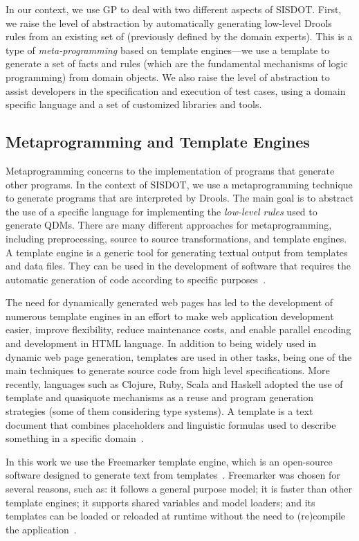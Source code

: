 In our context, we use GP to deal with two different aspects of SISDOT. First, 
we raise the level of abstraction by automatically generating low-level Drools 
rules from an existing set of \callers (previously defined by the domain experts). 
This is a type of \emph{meta-programming} based on template engines---we use a 
template to generate a set of facts and rules (which are the fundamental mechanisms of 
logic programming) from domain objects. We also raise the level of abstraction to 
assist developers in the specification and execution of test cases, using a 
domain specific language and a set of customized libraries and tools.  


\subsection{Metaprogramming and Template Engines}

Metaprogramming concerns to the implementation of programs that 
generate other programs. In the context of SISDOT, we use a metaprogramming 
technique to generate programs that are interpreted by Drools. The main goal 
is to abstract the use of a specific language for implementing the 
\emph{low-level rules} used to generate QDMs. There are many different 
approaches for metaprogramming, including preprocessing, source to source 
transformations, and template engines. 
A template engine is a generic tool for generating textual output from templates and data 
files. They can be used 
in the development of software that requires the automatic generation of code 
according to specific purposes~\cite{benato2017}. 

The need for dynamically generated web pages has led to the development of numerous template engines 
in an effort to make web application development easier, improve flexibility, 
reduce maintenance costs, and enable parallel encoding and development in HTML language. 
In addition to being widely used in dynamic web page generation, templates are used in other tasks, 
being one of the main techniques to generate source code from high level specifications. More 
recently, languages such as Clojure, Ruby, Scala and Haskell adopted the use of template and quasiquote 
mechanisms as a reuse and program generation strategies (some of them considering type systems).
A template is a text document that 
combines placeholders and linguistic formulas used to describe something in a specific domain~\cite{segura2017}. 

In this work we use the Freemarker template engine, which is an open-source software designed to 
generate text from templates~\cite{radjenovic2009}. Freemarker was chosen for several reasons, 
such as: it follows a general purpose model; it is faster than other template engines; it supports 
shared variables and model loaders; and its templates can be loaded or reloaded at runtime without the 
need to (re)compile the application~\cite{benato2017,parr2006}.

